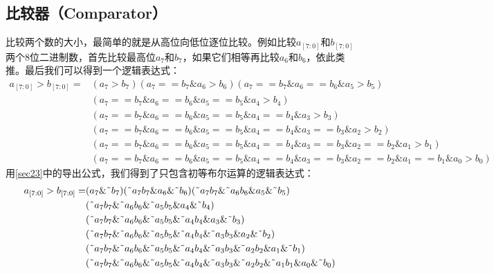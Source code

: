 \subsection{比较器（Comparator）}
比较两个数的大小，最简单的就是从高位向低位逐位比较。例如比较$a_{[7:0]}$和$b_{[7:0]}$两个8位二进制数，首先比较最高位$a_7$和$b_7$，如果它们相等再比较$a_6$和$b_6$，依此类推。最后我们可以得到一个逻辑表达式：
\[
  \begin{split}
    a_{[7:0]}\mathtt{>}b_{[7:0]}=
     & (a_7\mathtt{>}b_7)(a_7\mathtt{==}b_7\& a_6\mathtt{>}b_6)(a_7\mathtt{==}b_7\& a_6\mathtt{==}b_6\& a_5\mathtt{>}b_5) \\
     & (a_7\mathtt{==}b_7\& a_6\mathtt{==}b_6\& a_5\mathtt{==}b_5\& a_4\mathtt{>}b_4) \\
     & (a_7\mathtt{==}b_7\& a_6\mathtt{==}b_6\& a_5\mathtt{==}b_5\& a_4\mathtt{==}b_4\& a_3\mathtt{>}b_3) \\
     & (a_7\mathtt{==}b_7\& a_6\mathtt{==}b_6\& a_5\mathtt{==}b_5\& a_4\mathtt{==}b_4\& a_3\mathtt{==}b_3\& a_2\mathtt{>}b_2) \\
     & (a_7\mathtt{==}b_7\& a_6\mathtt{==}b_6\& a_5\mathtt{==}b_5\& a_4\mathtt{==}b_4\& a_3\mathtt{==}b_3\& a_2\mathtt{==}b_2\& a_1\mathtt{>}b_1) \\
     & (a_7\mathtt{==}b_7\& a_6\mathtt{==}b_6\& a_5\mathtt{==}b_5\& a_4\mathtt{==}b_4\& a_3\mathtt{==}b_3\& a_2\mathtt{==}b_2\& a_1\mathtt{==}b_1\& a_0\mathtt{>}b_0)
  \end{split}
\]
用\autoref{sec23}中的导出公式，我们得到了只包含初等布尔运算的逻辑表达式：
\[
  \begin{split}
    a_{[7:0]}>b_{[7:0]}=
     & (a_7\&\textrm{\~{}}b_7)(\textrm{\~{}}a_7b_7\& a_6\&\textrm{\~{}}b_6)(\textrm{\~{}}a_7b_7\&\textrm{\~{}}a_6b_6\& a_5\&\textrm{\~{}}b_5) \\
     & (\textrm{\~{}}a_7b_7\&\textrm{\~{}}a_6b_6\&\textrm{\~{}}a_5b_5\& a_4\&\textrm{\~{}}b_4) \\
     & (\textrm{\~{}}a_7b_7\&\textrm{\~{}}a_6b_6\&\textrm{\~{}}a_5b_5\&\textrm{\~{}}a_4b_4\& a_3\&\textrm{\~{}}b_3) \\
     & (\textrm{\~{}}a_7b_7\&\textrm{\~{}}a_6b_6\&\textrm{\~{}}a_5b_5\&\textrm{\~{}}a_4b_4\&\textrm{\~{}}a_3b_3\& a_2\&\textrm{\~{}}b_2) \\
     & (\textrm{\~{}}a_7b_7\&\textrm{\~{}}a_6b_6\&\textrm{\~{}}a_5b_5\&\textrm{\~{}}a_4b_4\&\textrm{\~{}}a_3b_3\&\textrm{\~{}}a_2b_2\& a_1\&\textrm{\~{}}b_1) \\
     & (\textrm{\~{}}a_7b_7\&\textrm{\~{}}a_6b_6\&\textrm{\~{}}a_5b_5\&\textrm{\~{}}a_4b_4\&\textrm{\~{}}a_3b_3\&\textrm{\~{}}a_2b_2\&\textrm{\~{}}a_1b_1\& a_0\&\textrm{\~{}}b_0)
  \end{split}
\]

